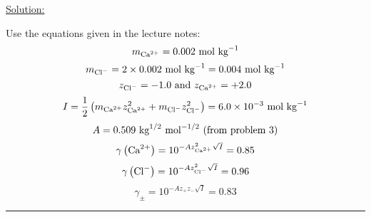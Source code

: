 \noindent
\underline{Solution:}

Use the equations given in the lecture notes:
$$m_{\textnormal{Ca}^{2+}} = 0.002\textnormal{ mol kg}^{-1}$$
$$m_{\textnormal{Cl}^-} = 2\times 0.002\textnormal{ mol kg}^{-1} = 0.004\textnormal{ mol kg}^{-1}$$
$$z_{\textnormal{Cl}^{-}} = -1.0\textnormal{ and }z_{\textnormal{Ca}^{2+}} = +2.0$$
$$I = \frac{1}{2}\left(m_{\textnormal{Ca}^{2+}}z_{\textnormal{Ca}^{2+}}^2 + m_{\textnormal{Cl}^-}z_{\textnormal{Cl}^-}^{2}\right) = 6.0\times 10^{-3}\textnormal{ mol kg}^{-1}$$
$$A = 0.509\textnormal{ kg}^{1/2}\textnormal{ mol}^{-1/2}\textnormal{ (from problem 3)}$$
$$\gamma\left(\textnormal{Ca}^{2+}\right) = 10^{-Az_{\textnormal{Ca}^{2+}}^2\sqrt{I}} = 0.85$$
$$\gamma\left(\textnormal{Cl}^-\right) = 10^{-Az_{\textnormal{Cl}^{-}}^2\sqrt{I}} = 0.96$$
$$\gamma_\pm = 10^{-Az_+z_-\sqrt{I}} = 0.83$$

\hrule\vspace{0.5cm}
